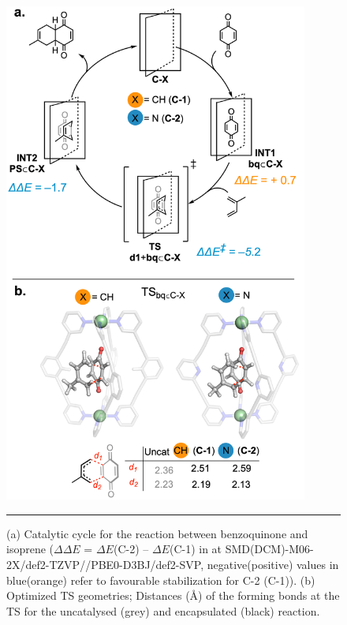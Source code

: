 \documentclass[../../main.tex]{subfiles}
\begin{document}
\begin{figure}[h!]
	\vspace{0.4cm}
	\centering
	\includegraphics[width=10cm]{3/da//figs/fig6/fig6}
	\vspace{0.2cm}
	\hrule
	\caption{(a) Catalytic cycle for the reaction between benzoquinone and isoprene ($\Delta\Delta E$ = $\Delta E$(C-2) – $\Delta E$(C-1) in \kcalx at SMD(DCM)-M06-2X/def2-TZVP//PBE0-D3BJ/def2-SVP, negative(positive) values in blue(orange) refer to favourable stabilization for C-2 (C-1)). (b) Optimized TS geometries; Distances (\AA) of the forming bonds at the TS for the uncatalysed (grey) and encapsulated (black) reaction.}
	\label{fig::da_6}
\end{figure}
\end{document}
